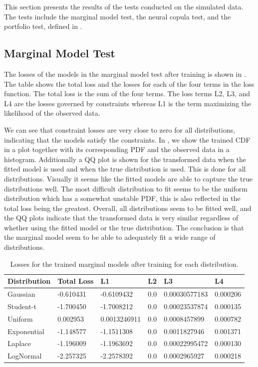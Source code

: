 This section presents the results of the tests conducted on the simulated data. The tests include the marginal model test, the neural copula test, and the portfolio test, defined in .

\subsection{Marginal Model Test}
The losses of the models in the marginal model test after training is shown in . The table shows the total loss and the losses for each of the four terms in the loss function. The total loss is the sum of the four terms. The loss terms L2, L3, and L4 are the losses governed by constraints whereas L1 is the term maximizing the likelihood of the observed data. 

We can see that constraint losses are very close to zero for all distributions, indicating that the models satisfy the constraints. In , we show the trained \gls{CDF} in a plot together with its corresponding \gls{PDF} and the observed data in a histogram. Additionally a QQ plot is shown for the transformed data when the fitted model is used and when the true distribution is used. This is done for all distributions. Visually it seems like the fitted models are able to capture the true distributions well. The most difficult distribution to fit seems to be the uniform distribution which has a somewhat unstable \gls{PDF}, this is also reflected in the total loss being the greatest. Overall, all distributions seem to be fitted well, and the QQ plots indicate that the transformed data is very similar regardless of whether using the fitted model or the true distribution. The conclusion is that the marginal model seem to be able to adequately fit a wide range of distributions. 

\begin{table}[h]
    \centering
    \caption{Losses for the trained marginal models after training for each distribution.}
    \begin{tabular}{llllll}
        Distribution & Total Loss & L1 & L2 & L3 & L4 \\
        \midrule
        Gaussian & -0.610431 & -0.6109432 & 0.0 & 0.00030577183 & 0.000206 \\
        Student-t & -1.700450 & -1.7008212 & 0.0 & 0.00023537874 & 0.000135 \\
        Uniform & 0.002953 & 0.0013246911 & 0.0 & 0.0008457899 & 0.000782 \\
        Exponential & -1.148577 & -1.1511308 & 0.0 & 0.0011827946 & 0.001371 \\
        Laplace & -1.196009 & -1.1963692 & 0.0 & 0.00022995472 & 0.000130 \\
        LogNormal & -2.257325 & -2.2578392 & 0.0 & 0.0002965927 & 0.000218 \\
    \end{tabular}
    \label{tab:MarginalFinalLosses}
\end{table}


